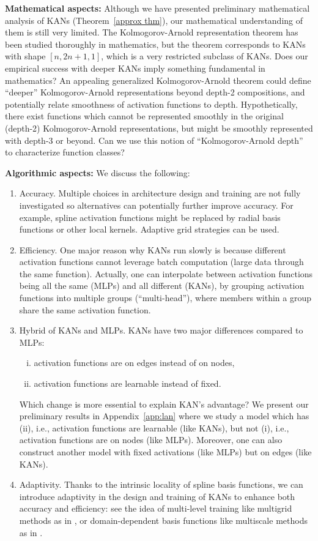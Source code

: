 \documentclass{article}
\numberwithin{equation}{section}
\numberwithin{figure}{section}
\begin{document}
{\bf Mathematical aspects:} Although we have presented preliminary mathematical analysis of KANs (Theorem~\ref{approx thm}), our mathematical understanding of them is still very limited. The Kolmogorov-Arnold representation theorem has been studied thoroughly in mathematics, but the theorem corresponds to KANs with shape $[n,2n+1,1]$, which is a very restricted subclass of KANs. Does our empirical success with deeper KANs imply something fundamental in mathematics? An appealing generalized Kolmogorov-Arnold theorem could  define ``deeper'' Kolmogorov-Arnold representations beyond depth-2 compositions, and potentially relate smoothness of activation functions to depth. Hypothetically, there exist functions which cannot be represented smoothly in the original (depth-2) Kolmogorov-Arnold representations, but might be smoothly represented with depth-3 or beyond. Can we use this notion of ``Kolmogorov-Arnold depth'' to characterize function classes?


{\bf Algorithmic aspects:} We discuss the following:
\begin{enumerate}[(1)]
    \item Accuracy. Multiple choices in architecture design and training are not fully investigated so alternatives can potentially further improve accuracy. For example, spline activation functions might be replaced by radial basis functions or other local kernels. Adaptive grid strategies can be used.
    \item  Efficiency. One major reason why KANs run slowly is because different activation functions cannot leverage batch computation (large data through the same function). Actually, one can interpolate between activation functions being all the same (MLPs) and all different (KANs), by grouping activation functions into multiple groups (``multi-head''), where members within a group share the same activation function. 
    \item Hybrid of KANs and MLPs. KANs have two major differences compared to MLPs: 
    \begin{enumerate}[(i)]
        \item activation functions are on edges instead of on nodes,
        \item activation functions are learnable instead of fixed.
    \end{enumerate}
    Which change is more essential to explain KAN's advantage? We present our preliminary results in Appendix~\ref{app:lan} where we study a model which has (ii), i.e., activation functions are learnable (like KANs),  but not (i), i.e., activation functions are on nodes (like MLPs). Moreover, one can also construct another model with fixed activations (like MLPs) but on edges (like KANs).
    \item Adaptivity. Thanks to the intrinsic locality of spline basis functions, we can introduce adaptivity in the design and training of KANs to enhance both accuracy and efficiency: see the idea of multi-level training like multigrid methods as in \cite{zhang2021multiscale,xu2017algebraic}, or domain-dependent basis functions like multiscale methods as in \cite{chen2023exponentially}.
\end{enumerate}
\end{document}

